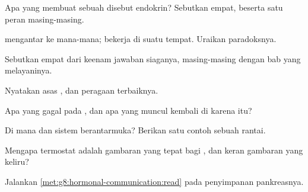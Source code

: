 \begin{exercise}[$\star$]\label{exo:g8:hormonal-communication:1}
Apa yang membuat sebuah  disebut endokrin? Sebutkan
empat, beserta satu peran  masing-masing.
\end{exercise}

\begin{exercise}[$\star$]\label{exo:g8:hormonal-communication:2}
 mengantar ke mana-mana;  bekerja di suatu
tempat. Uraikan paradoksnya.
\end{exercise}

\begin{exercise}[$\star$]\label{exo:g8:hormonal-communication:3}
Sebutkan empat dari keenam jawaban  siaganya,
masing-masing dengan bab yang melayaninya.
\end{exercise}

\begin{exercise}[$\star$]\label{exo:g8:hormonal-communication:4}
Nyatakan asas , dan peragaan terbaiknya.
\end{exercise}

\begin{exercise}[$\star$]\label{exo:g8:hormonal-communication:5}
Apa yang gagal pada , dan apa yang muncul kembali di
 karena itu?
\end{exercise}

\begin{exercise}[$\star$]\label{exo:g8:hormonal-communication:6}
Di mana  dan sistem  berantarmuka?
Berikan satu contoh sebuah rantai.
\end{exercise}

\begin{exercise}[$\star\star$]\label{exo:g8:hormonal-communication:7}
Mengapa termostat adalah gambaran yang tepat bagi , dan keran gambaran yang keliru?
\end{exercise}

\begin{exercise}[$\star\star$]\label{exo:g8:hormonal-communication:8}
Jalankan \cref{met:g8:hormonal-communication:read} pada
 penyimpanan pankreasnya.
\end{exercise}

